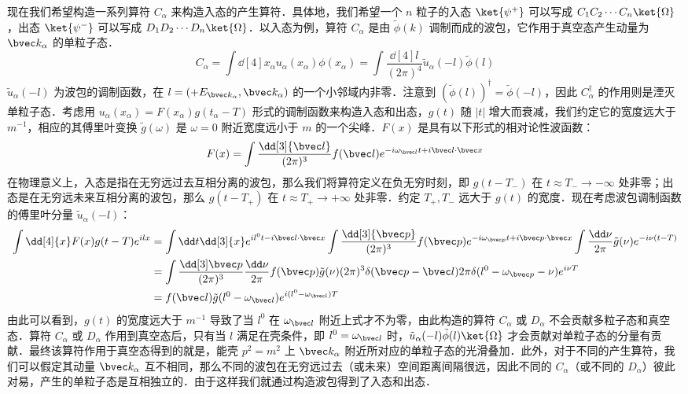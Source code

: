 现在我们希望构造一系列算符 $C_\alpha$ 来构造入态的产生算符．具体地，我们希望一个 $n$ 粒子的入态 $\ket{\psi^+}$ 可以写成 $C_1C_2\cdots C_n \ket{\Omega}$，出态 $\ket{\psi^-}$ 可以写成 $D_1D_2\cdots D_n \ket{\Omega}$．以入态为例，算符 $C_\alpha$ 是由 $\tilde \phi(k)$ 调制而成的波包，它作用于真空态产生动量为 $\bvec k_\alpha$ 的单粒子态．
\[
C_\alpha=\int \dd[4]{x_\alpha} u_\alpha(x_\alpha)\phi(x_\alpha) = \int \frac{\dd[4] l}{(2\pi)^4} \tilde{u}_\alpha(-l)\tilde\phi(l)
\]
$\tilde{u}_\alpha(-l)$ 为波包的调制函数，在 $l=(+E_{\bvec k_\alpha},\bvec k_\alpha)$ 的一个小邻域内非零．注意到 $(\tilde{\phi}(l))^\dagger=\tilde{\phi}(-l)$，因此 $C_\alpha^\dagger$ 的作用则是湮灭单粒子态．考虑用 $u_\alpha(x_\alpha)=F(x_\alpha)g(t_\alpha-T)$ 形式的调制函数来构造入态和出态，$g(t)$ 随 $|t|$ 增大而衰减，我们约定它的宽度远大于 $m^{-1}$，相应的其傅里叶变换 $\tilde g(\omega)$ 是 $\omega=0$ 附近宽度远小于 $m$ 的一个尖峰．$F(x)$ 是具有以下形式的相对论性波函数：
\[
F(x)=\int \frac{\dd[3]{\bvec l}}{(2\pi)^3} f(\bvec l) e^{-i\omega_{\bvec l}t+i\bvec l\cdot \bvec x}
\]
在物理意义上，入态是指在无穷远过去互相分离的波包，那么我们将算符定义在负无穷时刻，即 $g(t-T_-)$ 在 $t\approx T_-\rightarrow -\infty$ 处非零；出态是在无穷远未来互相分离的波包，那么 $g(t-T_+)$ 在 $t\approx T_+\rightarrow +\infty$ 处非零．约定 $T_+,T_-$ 远大于 $g(t)$ 的宽度．现在考虑波包调制函数的傅里叶分量 $\tilde{u}_\alpha(-l)$：
\begin{equation}\begin{aligned}
\int \dd[4]{x}F(x)g(t-T)e^{ilx}&=\int \dd t \dd[3]{x} e^{il^0t - i\bvec l\cdot \bvec x}\int \frac{\dd[3]{\bvec p}}{(2\pi)^3}f(\bvec p)e^{-i\omega_{\bvec p}t+i\bvec p\cdot \bvec x}\int \frac{\dd \nu}{2\pi}\tilde g(\nu) e^{-i\nu(t-T)}\\
&=\int \frac{\dd[3]\bvec p}{(2\pi)^3}\frac{\dd \nu}{2\pi} f(\bvec p)\tilde g(\nu) (2\pi)^3 \delta(\bvec p-\bvec l) 2\pi \delta(l^0-\omega_{\bvec p}-\nu)e^{i\nu T}\\
&=f(\bvec l) \tilde g(l^0-\omega_{\bvec l})e^{i(l^0-\omega_{\bvec l})T}
\end{aligned}\end{equation}
由此可以看到，$g(t)$ 的宽度远大于 $m^{-1}$ 导致了当 $l^0$ 在 $\omega_{\bvec l}$ 附近上式才不为零，由此构造的算符 $C_\alpha$ 或 $D_\alpha$ 不会贡献多粒子态和真空态．算符 $C_\alpha$ 或 $D_\alpha$ 作用到真空态后，只有当 $l$ 满足在壳条件，即 $l^0=\omega_{\bvec l}$ 时，$\tilde{u}_\alpha(-l)\tilde \phi(l) \ket{\Omega}$ 才会贡献对单粒子态的分量有贡献．最终该算符作用于真空态得到的就是，能壳 $p^2=m^2$ 上 $\bvec k_\alpha$ 附近所对应的单粒子态的光滑叠加．此外，对于不同的产生算符，我们可以假定其动量 $\bvec k_\alpha$ 互不相同，那么不同的波包在无穷远过去（或未来）空间距离间隔很远，因此不同的 $C_\alpha$（或不同的 $D_\alpha$）彼此对易，产生的单粒子态是互相独立的．由于这样我们就通过构造波包得到了入态和出态．
